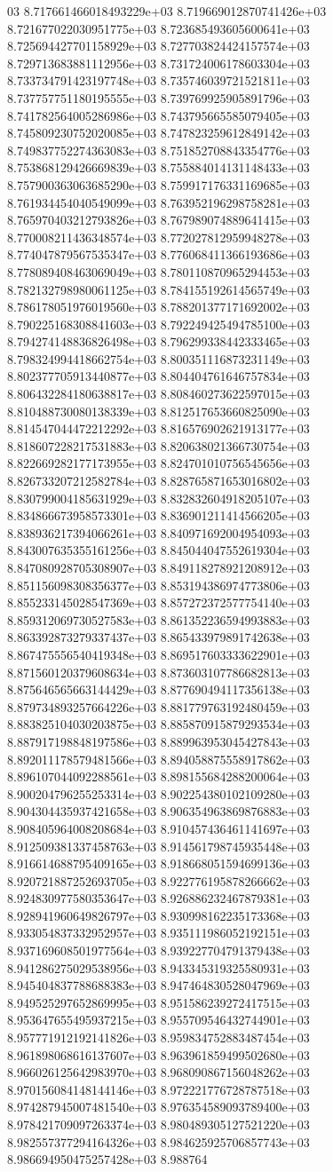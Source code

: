 03	8.717661466018493229e+03	8.719669012870741426e+03	8.721677022030951775e+03	8.723685493605600641e+03	8.725694427701158929e+03	8.727703824424157574e+03	8.729713683881112956e+03	8.731724006178603304e+03	8.733734791423197748e+03	8.735746039721521811e+03	8.737757751180195555e+03	8.739769925905891796e+03	8.741782564005286986e+03	8.743795665585079405e+03	8.745809230752020085e+03	8.747823259612849142e+03	8.749837752274363083e+03	8.751852708843354776e+03	8.753868129426669839e+03	8.755884014131148433e+03	8.757900363063685290e+03	8.759917176331169685e+03	8.761934454040549099e+03	8.763952196298758281e+03	8.765970403212793826e+03	8.767989074889641415e+03	8.770008211436348574e+03	8.772027812959948278e+03	8.774047879567535347e+03	8.776068411366193686e+03	8.778089408463069049e+03	8.780110870965294453e+03	8.782132798980061125e+03	8.784155192614565749e+03	8.786178051976019560e+03	8.788201377171692002e+03	8.790225168308841603e+03	8.792249425494785100e+03	8.794274148836826498e+03	8.796299338442333465e+03	8.798324994418662754e+03	8.800351116873231149e+03	8.802377705913440877e+03	8.804404761646757834e+03	8.806432284180638817e+03	8.808460273622597015e+03	8.810488730080138339e+03	8.812517653660825090e+03	8.814547044472212292e+03	8.816576902621913177e+03	8.818607228217531883e+03	8.820638021366730754e+03	8.822669282177173955e+03	8.824701010756545656e+03	8.826733207212582784e+03	8.828765871653016802e+03	8.830799004185631929e+03	8.832832604918205107e+03	8.834866673958573301e+03	8.836901211414566205e+03	8.838936217394066261e+03	8.840971692004954093e+03	8.843007635355161256e+03	8.845044047552619304e+03	8.847080928705308907e+03	8.849118278921208912e+03	8.851156098308356377e+03	8.853194386974773806e+03	8.855233145028547369e+03	8.857272372577754140e+03	8.859312069730527583e+03	8.861352236594993883e+03	8.863392873279337437e+03	8.865433979891742638e+03	8.867475556540419348e+03	8.869517603333622901e+03	8.871560120379608634e+03	8.873603107786682813e+03	8.875646565663144429e+03	8.877690494117356138e+03	8.879734893257664226e+03	8.881779763192480459e+03	8.883825104030203875e+03	8.885870915879293534e+03	8.887917198848197586e+03	8.889963953045427843e+03	8.892011178579481566e+03	8.894058875558917862e+03	8.896107044092288561e+03	8.898155684288200064e+03	8.900204796255253314e+03	8.902254380102109280e+03	8.904304435937421658e+03	8.906354963869876883e+03	8.908405964008208684e+03	8.910457436461141697e+03	8.912509381337458763e+03	8.914561798745935448e+03	8.916614688795409165e+03	8.918668051594699136e+03	8.920721887252693705e+03	8.922776195878266662e+03	8.924830977580353647e+03	8.926886232467879381e+03	8.928941960649826797e+03	8.930998162235173368e+03	8.933054837332952957e+03	8.935111986052192151e+03	8.937169608501977564e+03	8.939227704791379438e+03	8.941286275029538956e+03	8.943345319325580931e+03	8.945404837788688383e+03	8.947464830528047969e+03	8.949525297652869995e+03	8.951586239272417515e+03	8.953647655495937215e+03	8.955709546432744901e+03	8.957771912192141826e+03	8.959834752883487454e+03	8.961898068616137607e+03	8.963961859499502680e+03	8.966026125642983970e+03	8.968090867156048262e+03	8.970156084148144146e+03	8.972221776728787518e+03	8.974287945007481540e+03	8.976354589093789400e+03	8.978421709097263374e+03	8.980489305127521220e+03	8.982557377294164326e+03	8.984625925706857743e+03	8.986694950475257428e+03	8.988764